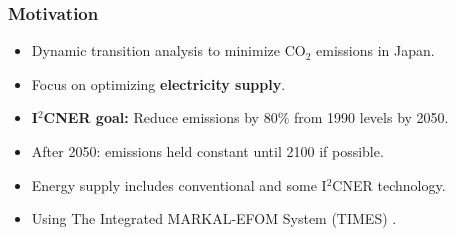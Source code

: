 
\begin{frame}
  \frametitle{Motivation}
   \begin{itemize}
   
   \item Dynamic transition analysis to minimize CO$_2$ emissions in Japan.
   
   \item Focus on optimizing \textbf{electricity supply}.
   
   \item \textbf{I$^2$CNER goal:} Reduce emissions by 80\% from 1990 levels by 2050. 
   
   \item After 2050: emissions held constant until 2100 if possible.
   
   \item Energy supply includes conventional and some I$^2$CNER technology.
   
   \item Using The Integrated MARKAL-EFOM System (TIMES) \cite{loulou_documentation_2005}.
   \end{itemize}
        
\end{frame}
